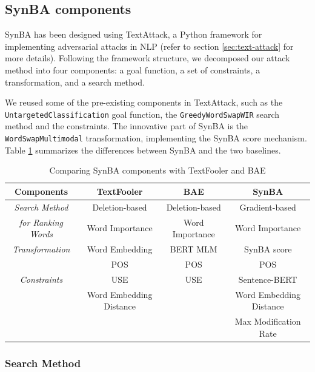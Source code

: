 \subsection{SynBA components}\label{subsec:synba-components}
SynBA has been designed using TextAttack, a Python framework for implementing adversarial attacks in NLP (refer to section \ref{sec:text-attack} for more details).
Following the framework structure, we decomposed our attack method into four components: a goal function, a set of constraints, a transformation, and a search method.

We reused some of the pre-existing components in TextAttack, such as the \texttt{UntargetedClassification} goal function, the \texttt{GreedyWordSwapWIR} search method and the constraints. 
The innovative part of SynBA is the \texttt{WordSwapMultimodal} transformation, implementing the SynBA score mechanism.
Table \ref{tab:3_3_comparing_components} summarizes the differences between SynBA and the two baselines.

\begin{table}[h]
    \footnotesize
\centering
\begin{tabular}{|c||c|c|c|}
\hline
\textbf{Components} & \textbf{TextFooler} & \textbf{BAE}  & \textbf{SynBA}\\ \hline\hline
\emph{Search Method} &  Deletion-based &   Deletion-based & Gradient-based\\ 
\emph{for Ranking Words} & Word Importance & Word Importance & Word Importance \\ \hline
\emph{Transformation} & Word Embedding & BERT MLM & SynBA score \\ \hline
 & POS  & POS & POS \\ 
 \emph{Constraints} & USE & USE & Sentence-BERT \\ 
 & Word Embedding Distance &  & Word Embedding Distance \\ 
 &  &  & Max Modification Rate \\ \hline
 
\end{tabular}
\caption{Comparing SynBA components with TextFooler and BAE}
\label{tab:3_3_comparing_components}
\end{table}

\subsubsection{Search Method}\label{subsubsec:search-method}

